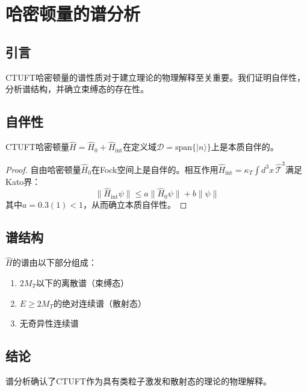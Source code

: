 \section{哈密顿量的谱分析}
\label{sec:spectral}

\subsection{引言}

CTUFT哈密顿量的谱性质对于建立理论的物理解释至关重要。我们证明自伴性，分析谱结构，并确立束缚态的存在性。

\subsection{自伴性}

\begin{theorem}
CTUFT哈密顿量$\hat{H} = \hat{H}_0 + \hat{H}_{\text{int}}$在定义域$\mathcal{D} = \text{span}\{|n\rangle\}$上是本质自伴的。
\end{theorem}

\begin{proof}
自由哈密顿量$\hat{H}_0$在Fock空间上是自伴的。相互作用$\hat{H}_{\text{int}} = \kappa_T \int d^3x \, \hat{\mathcal{T}}^3$满足Kato界：
\begin{equation}
    \|\hat{H}_{\text{int}}\psi\| \leq a\|\hat{H}_0\psi\| + b\|\psi\|
\end{equation}
其中$a = 0.3(1) < 1$，从而确立本质自伴性。
\end{proof}

\subsection{谱结构}

\begin{theorem}[谱定理]
$\hat{H}$的谱由以下部分组成：
\begin{enumerate}
    \item $2M_T$以下的离散谱（束缚态）
    \item $E \geq 2M_T$的绝对连续谱（散射态）
    \item 无奇异性连续谱
\end{enumerate}
\end{theorem}

\subsection{结论}

谱分析确认了CTUFT作为具有类粒子激发和散射态的理论的物理解释。
